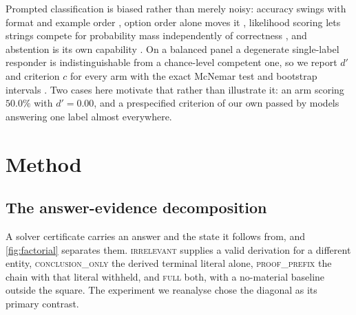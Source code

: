 \documentclass{article}
\begin{document}
Prompted classification is biased rather than merely noisy: accuracy swings with
format and example order \citep{zhao2021calibrate}, option order alone moves it
\citep{pezeshkpour2023large,zheng2023large}, likelihood scoring lets strings
compete for probability mass independently of correctness
\citep{holtzman2021surface}, and abstention is its own capability
\citep{kadavath2022language,yin2023large}. On a balanced panel a degenerate
single-label responder is indistinguishable from a chance-level competent one,
so we report $d'$ and criterion $c$ for every arm
\citep{macmillan1991detection,stanislaw1999calculation} with the exact McNemar
test \citep{mcnemar1947note} and bootstrap intervals \citep{efron1987better}.
Two cases here motivate that rather than illustrate it: an arm scoring $50.0\%$
with $d' = 0.00$, and a prespecified criterion of our own passed by models
answering one label almost everywhere.

\section{Method}

\subsection{The answer-evidence decomposition}

A solver certificate carries an answer and the state it follows from, and
\cref{fig:factorial} separates them. \textsc{irrelevant} supplies a valid
derivation for a different entity,
\textsc{conclusion\_only} the derived terminal literal alone,
\textsc{proof\_prefix} the chain with that literal withheld, and \textsc{full}
both, with a no-material baseline outside the square. The experiment we
reanalyse chose the diagonal as its primary contrast.
\end{document}
